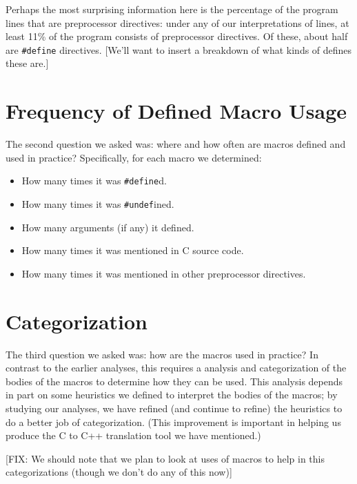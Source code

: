 Perhaps the most surprising information here is the percentage of the
program lines that are preprocessor directives: under any of our
interpretations of lines, at least 11\% of the program consists of
preprocessor directives.  Of these, about half are \verb+#define+
directives.  [We'll want to insert a breakdown of what kinds of
defines these are.]

\section{Frequency of Defined Macro Usage}\label{sec:usage}

The second question we asked was: where and how often are macros
defined and used in practice?  Specifically, for each macro we
determined:
\begin{itemize}

\item How many times it was \verb+#define+d.
\item How many times it was \verb+#undef+ined.
\item How many arguments (if any) it defined.
\item How many times it was mentioned in C source code.
\item How many times it was mentioned in other preprocessor
directives.

\end{itemize}

\section{Categorization}\label{sec:categorization}

The third question we asked was: how are the macros used in practice?
In contrast to the earlier analyses, this requires a analysis and
categorization of the bodies of the macros to determine how they can
be used.  This analysis depends in part on some heuristics we defined
to interpret the bodies of the macros; by studying our analyses, we
have refined (and continue to refine) the heuristics to do a better
job of categorization.  (This improvement is important in helping us
produce the C to C++ translation tool we have mentioned.)

[FIX: We should note that we plan to look at uses of macros to help in
this categorizations (though we don't do any of this now)]

